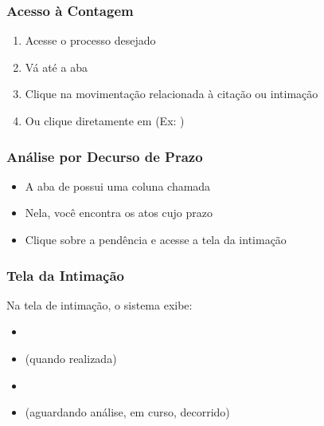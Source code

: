 \documentclass[letterpaper,10pt,brazil]{sphinxmanual}
\begin{document}
\subsubsection{Acesso à Contagem}
\label{\detokenize{projud_31_contagemprazo:acesso-a-contagem}}\begin{enumerate}
%
\item {} 
\sphinxAtStartPar
Acesse o processo desejado

\item {} 
\sphinxAtStartPar
Vá até a aba 

\item {} 
\sphinxAtStartPar
Clique na movimentação relacionada à citação ou intimação

\item {} 
\sphinxAtStartPar
Ou clique diretamente em  (Ex: )

\end{enumerate}


\subsubsection{Análise por Decurso de Prazo}
\label{\detokenize{projud_31_contagemprazo:analise-por-decurso-de-prazo}}\begin{itemize}
\item {} 
\sphinxAtStartPar
A aba de  possui uma coluna chamada 

\item {} 
\sphinxAtStartPar
Nela, você encontra os atos cujo prazo 

\item {} 
\sphinxAtStartPar
Clique sobre a pendência e acesse a tela da intimação

\end{itemize}


\subsubsection{Tela da Intimação}
\label{\detokenize{projud_31_contagemprazo:tela-da-intimacao}}
\sphinxAtStartPar
Na tela de intimação, o sistema exibe:
\begin{itemize}
\item {} 
\sphinxAtStartPar
{}

\item {} 
\sphinxAtStartPar
{} (quando realizada)

\item {} 
\sphinxAtStartPar
{}

\item {} 
\sphinxAtStartPar
{} (aguardando análise, em curso, decorrido)

\end{itemize}
\end{document}
